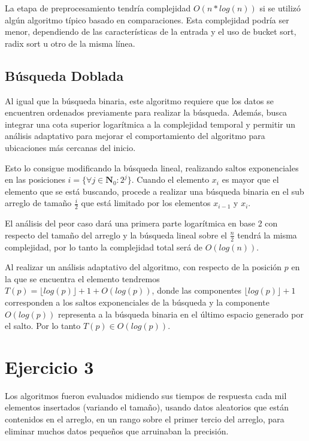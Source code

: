 \documentclass[]{article}
\begin{document}
La etapa de preprocesamiento tendría complejidad $O(n*log(n))$ si se utilizó algún algoritmo típico basado en comparaciones. Esta complejidad podría ser menor, dependiendo de las características de la entrada y el uso de bucket sort, radix sort u otro de la misma línea.

\subsection{Búsqueda Doblada}

Al igual que la búsqueda binaria, este algoritmo requiere que los datos se encuentren ordenados previamente para realizar la búsqueda. Además, busca integrar una cota superior logarítmica a la complejidad temporal y permitir un análisis adaptativo para mejorar el comportamiento del algoritmo para ubicaciones más cercanas del inicio.

Esto lo consigue modificando la búsqueda lineal, realizando saltos exponenciales en las posiciones $i = \{ \forall j \in \mathbf{N}_{0} : 2^j \}$. Cuando el elemento $x_{i}$ es mayor que el elemento que se está buscando, procede a realizar una búsqueda binaria en el sub arreglo de tamaño $\frac{i}{2}$ que está limitado por los elementos $x_{i-1}$ y $x_{i}$.

El análisis del peor caso dará una primera parte logarítmica en base 2 con respecto del tamaño del arreglo y la búsqueda lineal sobre el $\frac{n}{2}$ tendrá la misma complejidad, por lo tanto la complejidad total será de $O(log(n))$.

Al realizar un análisis adaptativo del algoritmo, con respecto de la posición $p$ en la que se encuentra el elemento tendremos $T(p) = \lfloor log(p) \rfloor + 1 + O(log(p))$, donde las componentes $\lfloor log(p) \rfloor + 1$ corresponden a los saltos exponenciales de la búsqueda y la componente $O(log(p))$ representa a la búsqueda binaria en el último espacio generado por el salto. Por lo tanto $T(p) \in O(log(p))$.

\section{Ejercicio 3}

Los algoritmos fueron evaluados midiendo sus tiempos de respuesta cada mil elementos insertados (variando el tamaño), usando datos aleatorios que están contenidos en el arreglo, en un rango sobre el primer tercio del arreglo, para eliminar muchos datos pequeños que arruinaban la precisión.
\end{document}
